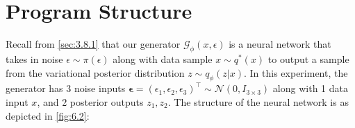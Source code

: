 \documentclass[honours,12pt]{unswthesis}
\numberwithin{equation}{section}
\theoremstyle{definition}
\begin{document}
\section{Program Structure}
Recall from \autoref{sec:3.8.1} that our generator $\mathcal{G}_\phi(x,\epsilon)$ is a neural network that takes in noise $\epsilon\sim \pi(\epsilon)$ along with data sample $x\sim q^*(x)$ to output a sample from the variational posterior distribution $z\sim q_\phi(z|x)$. In this experiment, the generator has 3 noise inputs $\bm{\epsilon}=(\epsilon_1,\epsilon_2,\epsilon_3)^\top \sim \mathcal{N}(0,I_{3\times 3})$ along with 1 data input $x$, and 2 posterior outputs $z_1, z_2$. The structure of the neural network is as depicted in \autoref{fig:6.2}:
\begin{figure}[h!]
\end{figure}
\end{document}
